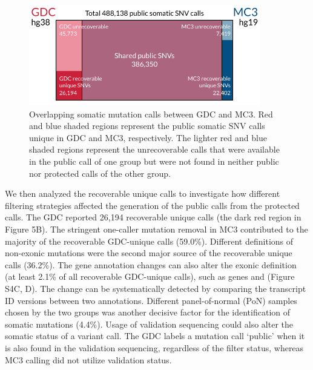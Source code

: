 \begin{figure}[tb]
    \centering
    \includegraphics[width=0.9\textwidth]{figures/chap02_mutation_pipeline_qc/overlap_venn_diagram.pdf}
    \caption[Overlapping somatic mutation calls between GDC and MC3.]{Overlapping somatic mutation calls between GDC and MC3. Red and blue shaded regions represent the public somatic SNV calls unique in GDC and MC3, respectively. The lighter red and blue shaded regions represent the unrecoverable calls that were available in the public call of one group but were not found in neither public nor protected calls of the other group.}
    \label{fig:mut-call-qc-venn-diagram}
\end{figure}

We then analyzed the recoverable unique calls to investigate how different filtering strategies affected the generation of the public calls from the protected calls. The GDC reported 26,194 recoverable unique calls (the dark red region in Figure 5B). The stringent one-caller mutation removal in MC3 contributed to the majority of the recoverable GDC-unique calls (59.0\%). Different definitions of non-exonic mutations were the second major source of the recoverable unique calls (36.2\%). The gene annotation changes can also alter the exonic definition (at least 2.1\% of all recoverable GDC-unique calls), such as genes  and  (Figure S4C, D). The change can be systematically detected by comparing the transcript ID versions between two annotations. Different panel-of-normal (PoN) samples chosen by the two groups was another decisive factor for the identification of somatic mutations (4.4\%). Usage of validation sequencing could also alter the somatic status of a variant call. The GDC labels a mutation call `public' when it is also found in the validation sequencing, regardless of the filter status, whereas MC3 calling did not utilize validation status.

